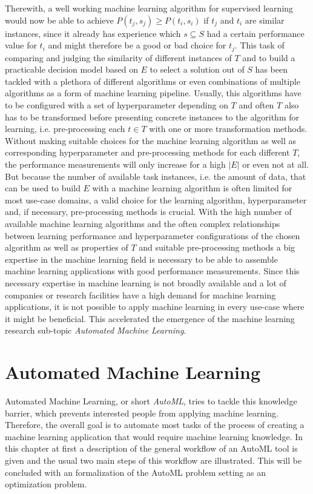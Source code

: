 Therewith, a well working machine learning algorithm for supervised learning would now be able to achieve $P(t_j, s_j) \geq P(t_i, s_i)$ if $t_j$ and $t_i$ are similar instances, since it already has experience which $s\subseteq S$ had a certain performance value for $t_i$ and might therefore be a good or bad choice for $t_j$.\newline
This task of comparing and judging the similarity of different instances of $T$ and to build a practicable decision model based on $E$ to select a solution out of $S$ has been tackled with a plethora of different algorithms or even combinations of multiple algorithms as a form of machine learning pipeline.
Usually, this algorithms have to be configured with a set of hyperparameter depending on $T$ and often $T$ also has to be transformed before presenting concrete instances to the algorithm for learning, i.e. pre-processing each $t\in T$ with one or more transformation methods.
Without making suitable choices for the machine learning algorithm as well as corresponding hyperparameter and pre-processing methods for each different $T$, the performance measurements will only increase for a high $|E|$ or even not at all.
But because the number of available task instances, i.e. the amount of data, that can be used to build $E$ with a machine learning algorithm is often limited for most use-case domains, a valid choice for the learning algorithm, hyperparameter and, if necessary, pre-processing methods is crucial.\newline
With the high number of available machine learning algorithms and the often complex relationships between learning performance and hyperparameter configurations of the chosen algorithm as well as properties of $T$ and suitable pre-processing methods a big expertise in the machine learning field is necessary to be able to assemble machine learning applications with good performance measurements.
Since this necessary expertise in machine learning is not broadly available and a lot of companies or research facilities have a high demand for machine learning applications, it is not possible to apply machine learning in every use-case where it might be beneficial.
This accelerated the emergence of the machine learning research sub-topic \textit{Automated Machine Learning}. 

\section{Automated Machine Learning}
\label{sec:theory:automl}
Automated Machine Learning, or short \textit{AutoML}, tries to tackle this knowledge barrier, which prevents interested people from applying machine learning.
Therefore, the overall goal is to automate most tasks of the process of creating a machine learning application that would require machine learning knowledge.\newline
In this chapter at first a description of the general workflow of an AutoML tool is given and the usual two main steps of this workflow are illustrated.
This will be concluded with an formalization of the AutoML problem setting as an optimization problem.

